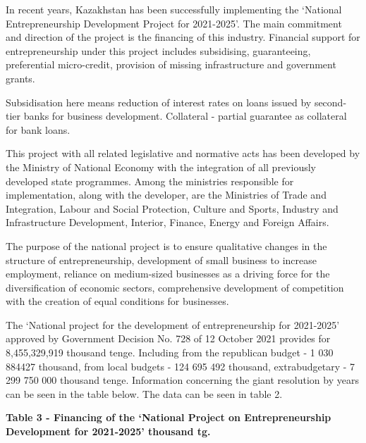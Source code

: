 In recent years, Kazakhstan has been successfully implementing the
`National Entrepreneurship Development Project for 2021-2025'. The main
commitment and direction of the project is the financing of this
industry. Financial support for entrepreneurship under this project
includes subsidising, guaranteeing, preferential micro-credit, provision
of missing infrastructure and government grants.

Subsidisation here means reduction of interest rates on loans issued by
second-tier banks for business development. Collateral - partial
guarantee as collateral for bank loans.

This project with all related legislative and normative acts has been
developed by the Ministry of National Economy with the integration of
all previously developed state programmes. Among the ministries
responsible for implementation, along with the developer, are the
Ministries of Trade and Integration, Labour and Social Protection,
Culture and Sports, Industry and Infrastructure Development, Interior,
Finance, Energy and Foreign Affairs.

The purpose of the national project is to ensure qualitative changes in
the structure of entrepreneurship, development of small business to
increase employment, reliance on medium-sized businesses as a driving
force for the diversification of economic sectors, comprehensive
development of competition with the creation of equal conditions for
businesses.

The `National project for the development of entrepreneurship for
2021-2025' approved by Government Decision No. 728 of 12 October 2021
provides for 8,455,329,919 thousand tenge. Including from the republican
budget - 1 030 884427 thousand, from local budgets - 124 695 492
thousand, extrabudgetary - 7 299 750 000 thousand tenge. Information
concerning the giant resolution by years can be seen in the table below.
The data can be seen in table 2.

{\bfseries Table 3 - Financing of the `National Project on Entrepreneurship
Development for 2021-2025' thousand tg.}

